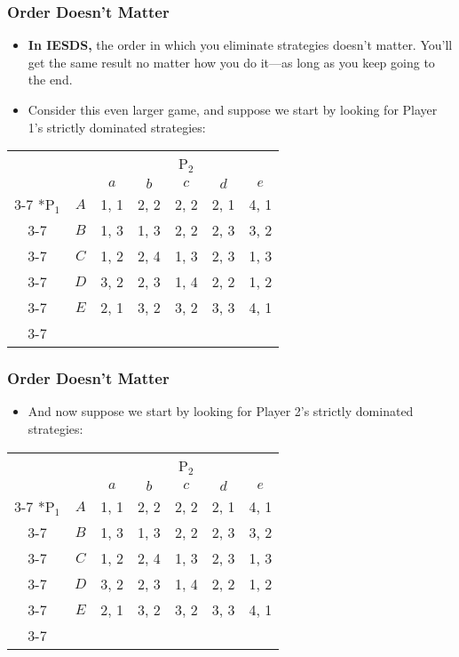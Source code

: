 \begin{frame}
\frametitle{Order Doesn't Matter}
\begin{itemize}
	\item \textbf{In IESDS,} the order in which you eliminate strategies doesn't matter. You'll get the same result no matter how you do it---as long as you keep going to the end.
	\item Consider this even larger game, and suppose we start by looking for Player 1's strictly dominated strategies:
\end{itemize}
\begin{table}[h]
	\centering
	\setlength{\extrarowheight}{2pt}
	\begin{tabular}{cc|c|c|c|c|c|}
		& \multicolumn{1}{c}{} & \multicolumn{5}{c}{P$_2$}\\
		& \multicolumn{1}{c}{} & \multicolumn{1}{c}{$a$} & \multicolumn{1}{c}{$b$} & \multicolumn{1}{c}{$c$} & \multicolumn{1}{c}{$d$} & \multicolumn{1}{c}{$e$} \\\cline{3-7}
		\multirow{5}*{P$_1$}  & $A$ & 1, 1 & 2, 2 & 2, 2 & 2, 1 & 4, 1 \\\cline{3-7}
		& $B$ & 1, 3 & 1, 3 & 2, 2 & 2, 3 & 3, 2 \\\cline{3-7}
		& $C$ & 1, 2 & 2, 4 & 1, 3 & 2, 3 & 1, 3 \\\cline{3-7}
		& $D$ & 3, 2 & 2, 3 & 1, 4 & 2, 2 & 1, 2 \\\cline{3-7}
		& $E$ & 2, 1 & 3, 2 & 3, 2 & 3, 3 & 4, 1 \\\cline{3-7}
	\end{tabular}
\end{table}
\end{frame}

\begin{frame}
\frametitle{Order Doesn't Matter}
\begin{itemize}
\item And now suppose we start by looking for Player 2's strictly dominated strategies:
\end{itemize}
\begin{table}[h]
\centering
\setlength{\extrarowheight}{2pt}
\begin{tabular}{cc|c|c|c|c|c|}
	& \multicolumn{1}{c}{} & \multicolumn{5}{c}{P$_2$}\\
	& \multicolumn{1}{c}{} & \multicolumn{1}{c}{$a$} & \multicolumn{1}{c}{$b$} & \multicolumn{1}{c}{$c$} & \multicolumn{1}{c}{$d$} & \multicolumn{1}{c}{$e$} \\\cline{3-7}
	\multirow{5}*{P$_1$}  & $A$ & 1, 1 & 2, 2 & 2, 2 & 2, 1 & 4, 1 \\\cline{3-7}
	& $B$ & 1, 3 & 1, 3 & 2, 2 & 2, 3 & 3, 2 \\\cline{3-7}
	& $C$ & 1, 2 & 2, 4 & 1, 3 & 2, 3 & 1, 3 \\\cline{3-7}
	& $D$ & 3, 2 & 2, 3 & 1, 4 & 2, 2 & 1, 2 \\\cline{3-7}
	& $E$ & 2, 1 & 3, 2 & 3, 2 & 3, 3 & 4, 1 \\\cline{3-7}
\end{tabular}
\end{table}
\end{frame}

